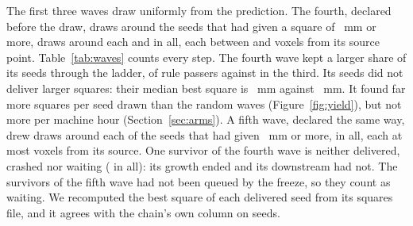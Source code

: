 The first three waves draw uniformly from the prediction. The fourth, declared before the draw, draws around the
\NearSources{} seeds that had given a square of \SourceThreshold{}~mm or more, \NearPerSource{} draws around each and
\NearDraws{} in all, each between \NearShellMin{} and \NearShellMax{} voxels from its source point. Table~\ref{tab:waves}
counts every step. The fourth wave kept a larger share of its seeds through the ladder, \WaveFourYield{} of rule
passers against \WaveThreeYield{} in the third. Its seeds did not deliver larger squares: their median best square is
\WaveFourSquareMedian{}~mm against \WaveThreeSquareMedian{}~mm. It found far more squares per seed drawn than the
random waves (Figure~\ref{fig:yield}), but not more per machine hour (Section~\ref{sec:arms}). A fifth wave, declared
the same way, drew \NearFivePerSource{} draws around each of the \NearFiveSources{} seeds that had given
\NearFiveThreshold{}~mm or more, \NearFiveDraws{} in all, each at most \NearFiveShellMax{} voxels from its source.
One survivor of the fourth wave is neither delivered, crashed nor waiting (\AllNotDeliveredOther{} in all): its growth
ended and its downstream had not. The \WaveFiveWaiting{} survivors of the fifth wave had not been queued by the freeze, so
they count as waiting. We recomputed the best square of each delivered seed from its squares file, and it
agrees with the chain's own column on \SquareCheckAll{} seeds.


